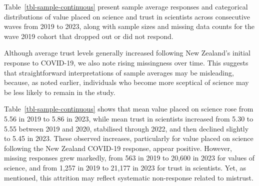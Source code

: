 \documentclass[
  single column]{article}
\begin{document}
Table~\ref{tbl-sample-continuous} present sample average responses and
categorical distributions of value placed on science and trust in
scientists across consecutive waves from 2019 to 2023, along with sample
sizes and missing data counts for the wave 2019 cohort that dropped out
or did not respond.

Although average trust levels generally increased following New
Zealand's initial response to COVID-19, we also note rising missingness
over time. This suggests that straightforward interpretations of sample
averages may be misleading, because, as noted earlier, individuals who
become more sceptical of science may be less likely to remain in the
study.

Table~\ref{tbl-sample-continuous} shows that mean value placed on
science rose from 5.56 in 2019 to 5.86 in 2023, while mean trust in
scientists increased from 5.30 to 5.55 between 2019 and 2020, stabilised
through 2022, and then declined slightly to 5.45 in 2023. These observed
increases, particularly for value placed on science following the New
Zealand COVID-19 response, appear positive. However, missing responses
grew markedly, from 563 in 2019 to 20,600 in 2023 for values of science,
and from 1,257 in 2019 to 21,177 in 2023 for trust in scientists. Yet,
as mentioned, this attrition may reflect systematic non-response related
to mistrust.
\end{document}
